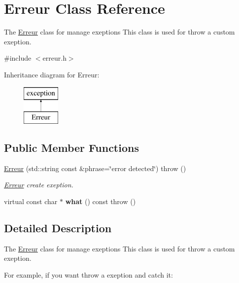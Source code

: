 \hypertarget{classErreur}{\section{Erreur Class Reference}
\label{classErreur}
}


The \hyperlink{classErreur}{Erreur} class for manage exeptions This class is used for throw a custom exeption.  




{\ttfamily \#include $<$erreur.\-h$>$}

Inheritance diagram for Erreur\-:\begin{figure}[H]
\begin{center}
\leavevmode
\includegraphics[height=2.000000cm]{classErreur}
\end{center}
\end{figure}
\subsection*{Public Member Functions}
\begin{DoxyCompactItemize}
\item 
\hyperlink{classErreur_a0d19b48536f8dbe265041bdc77446fca}{Erreur} (std\-::string const \&phrase=\char`\"{}error detected\char`\"{})  throw ()
\begin{DoxyCompactList}\small\item\em \hyperlink{classErreur}{Erreur} create exeption. \end{DoxyCompactList}\item 
\hypertarget{classErreur_a03f509dfcd70553d533a58ffb9db7cb6}{virtual const char $\ast$ {\bfseries what} () const   throw ()}\label{classErreur_a03f509dfcd70553d533a58ffb9db7cb6}

\end{DoxyCompactItemize}


\subsection{Detailed Description}
The \hyperlink{classErreur}{Erreur} class for manage exeptions This class is used for throw a custom exeption. 

For example, if you want throw a exeption and catch it\-:



